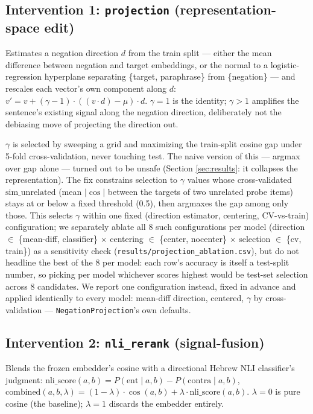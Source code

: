\documentclass{article}
\begin{document}
\subsection{Intervention 1: \texttt{projection} (representation-space edit)}

Estimates a negation direction $d$ from the train split --- either the mean
difference between negation and target embeddings, or the normal to a
logistic-regression hyperplane separating \{target, paraphrase\} from
\{negation\} --- and rescales each vector's own component along $d$:
$v' = v + (\gamma - 1) \cdot ((v \cdot d) - \mu) \cdot d$.
$\gamma = 1$ is the identity; $\gamma > 1$ amplifies the sentence's
existing signal along the negation direction, deliberately not the
debiasing move of projecting the direction out.

$\gamma$ is selected by sweeping a grid and maximizing the train-split
cosine gap under 5-fold cross-validation, never touching test. The naive
version of this --- argmax over gap alone --- turned out to be unsafe
(Section \ref{sec:results}: it collapses the representation). The fix
constrains selection to $\gamma$ values whose cross-validated
$\mathrm{sim\_unrelated}$ (mean $|\cos|$ between the targets of two
unrelated probe items) stays at or below a fixed threshold (0.5), then
argmaxes the gap among only those. This selects $\gamma$ within one fixed
(direction estimator, centering, CV-vs-train) configuration; we separately
ablate all 8 such configurations per model (direction $\in$
\{mean-diff, classifier\} $\times$ centering $\in$ \{center, nocenter\}
$\times$ selection $\in$ \{cv, train\}) as a sensitivity check
(\texttt{results/projection\_ablation.csv}), but do not headline the best
of the 8 per model: each row's accuracy is itself a test-split number, so
picking per model whichever scores highest would be test-set selection
across 8 candidates. We report one configuration instead, fixed in advance
and applied identically to every model: mean-diff direction, centered,
$\gamma$ by cross-validation --- \texttt{NegationProjection}'s own
defaults.

\subsection{Intervention 2: \texttt{nli\_rerank} (signal-fusion)}

Blends the frozen embedder's cosine with a directional Hebrew NLI
classifier's judgment: $\mathrm{nli\_score}(a,b) = P(\mathrm{ent} \mid a,b)
- P(\mathrm{contra} \mid a,b)$, $\mathrm{combined}(a,b,\lambda) = (1-\lambda)
\cdot \cos(a,b) + \lambda \cdot \mathrm{nli\_score}(a,b)$. $\lambda=0$ is
pure cosine (the baseline); $\lambda=1$ discards the embedder entirely.
\end{document}
